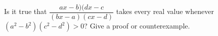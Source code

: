 Is it true that $\dfrac{ax-b) (dx-c}{(bx-a)(cx-d)}$ takes every real value whenever $(a^2-b^2)(c^2-d^2)>0$? Give a proof or counterexample.
